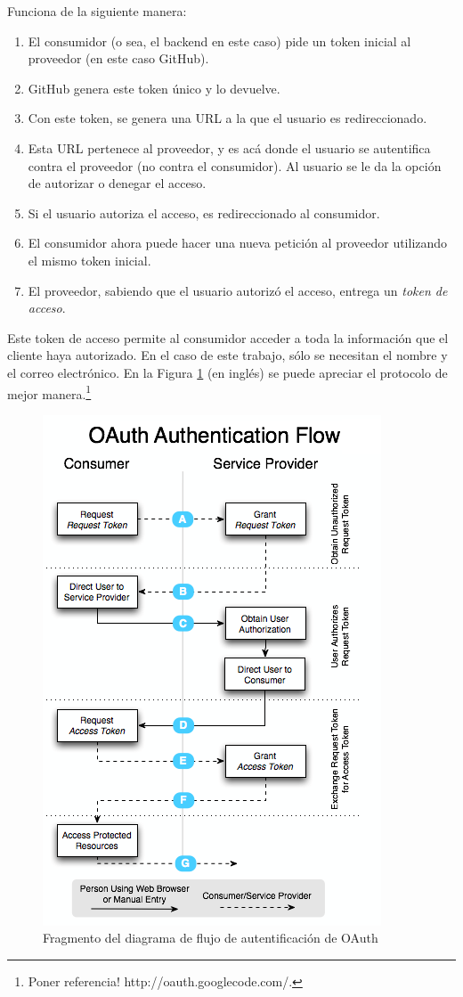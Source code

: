 \documentclass[12pt,titlepage,]{article}
\makeatletter
\def\maxwidth{\ifdim\Gin@nat@width>\linewidth\linewidth
\else\Gin@nat@width\fi}
\let\Oldincludegraphics\includegraphics
\renewcommand{\includegraphics}[1]{\Oldincludegraphics[width=\maxwidth]{#1}}
\makeatother
\begin{document}
Funciona de la siguiente manera:

\begin{enumerate}[1.]
\item
  El consumidor (o sea, el backend en este caso) pide un token inicial
  al proveedor (en este caso GitHub).
\item
  GitHub genera este token único y lo devuelve.
\item
  Con este token, se genera una URL a la que el usuario es
  redireccionado.
\item
  Esta URL pertenece al proveedor, y es acá donde el usuario se
  autentifica contra el proveedor (no contra el consumidor). Al usuario
  se le da la opción de autorizar o denegar el acceso.
\item
  Si el usuario autoriza el acceso, es redireccionado al consumidor.
\item
  El consumidor ahora puede hacer una nueva petición al proveedor
  utilizando el mismo token inicial.
\item
  El proveedor, sabiendo que el usuario autorizó el acceso, entrega un
  \emph{token de acceso}.
\end{enumerate}

Este token de acceso permite al consumidor acceder a toda la información
que el cliente haya autorizado. En el caso de este trabajo, sólo se
necesitan el nombre y el correo electrónico. En la Figura
\ref{figures:oauth} (en inglés) se puede apreciar el protocolo de mejor
manera.\footnote{Poner referencia! http://oauth.googlecode.com/.}

\begin{figure}[htbp]
\centering
\includegraphics{figures/oauth-diagram.png}
\caption{Fragmento del diagrama de flujo de autentificación de OAuth
\label{figures:oauth}}
\end{figure}
\end{document}
